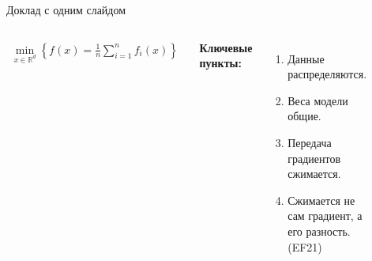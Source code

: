 \documentclass{beamer}
\begin{document}
\newcommand{\R}{\mathbb{R}}
\newcommand{\cC}{\mathcal{C}}
\begin{frame}{Доклад с одним слайдом}
\begin{columns}[c]
\begin{align*}
    \min \limits_{x \in \R^d} \left\{ f(x) = \frac{1}{n} \sum \limits_{i=1}^n f_i(x) \right\}
    \end{align*}

    \textbf{Ключевые пункты:}
    \begin{enumerate}
        \item Данные распределяются.
        \item Веса модели общие.
        \item Передача градиентов сжимается.
        \item Сжимается не сам градиент, а его разность. (EF21)
    \end{enumerate}

\begin{figure}
\includegraphics[width=1.0\textwidth]{output1.png}
\end{figure}\begin{figure}
\includegraphics[width=0.8\textwidth]{img3.png}
\end{figure}

\end{columns}

\end{frame}
\end{document}
